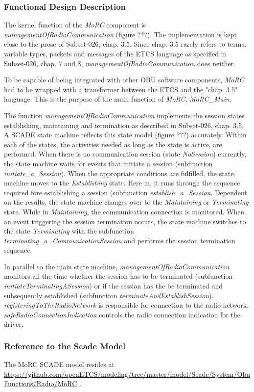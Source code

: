 \subsubsection{Functional Design Description}

The kernel function of the \textit{MoRC} component is \emph{managementOfRadioCommunication} (figure ???). The implementation is kept close to the prose of Subset-026, chap. 3.5. Since chap. 3.5 rarely refers to terms, variable types, packets and messages of the ETCS language as specified in Subset-026, chap. 7 and 8, \emph{managementOfRadioCommunication} does neither. 

To be capable of being integrated with other OBU software components, \emph{MoRC} had to be wrapped with a transformer between the ETCS and the "chap. 3.5" language. This is the purpose of the main function of \emph{MoRC}, \emph{MoRC\_Main}. 



The function \emph{managementOfRadioCommunication} implements the session states establishing, maintaining and termination as described in Subset-026, chap. 3.5. A SCADE state machine reflects this state model (figure ???) accurately. Within each of the states, the activities needed as long as the state is active, are performed. When there is no communication session (state \emph{NoSession}) currently, the state machine waits for events that initiate a session (subfunction \emph{initiate\_a\_Session}). When the appropriate conditions are fulfilled, the state machine moves to the \textit{Establishing} state. Here in, it runs through the sequence required fore establishing a session (subfunction \emph{establish\_a\_Session}. Dependent on the results, the state machine changes over to the \emph{Maintaining} or \emph{Terminating} state. While in \emph{Maintaining}, the communication connection is monitored. When an event triggering the session termination occurs, the state machine switches to the state \emph{Terminating} with the subfunction \emph{terminating\_a\_CommunicationSession} and performs the session termination sequence. 

In parallel to the main state machine, \emph{managementOfRadioCommunication} monitors all the time whether the session has to be terminated (subfunction \emph{initiateTerminatingASession}) or if the session has the be terminated and subsequently established (subfunction \emph{terminateAndEstablishSession}). \emph{registeringToTheRadioNetwork} is responsible for connection to the radio network. \emph{safeRadioConnectionIndication} controls the radio connection indication for the driver.


\subsubsection{Reference to the Scade Model}

The MoRC SCADE model resides at \url{https://github.com/openETCS/modeling/tree/master/model/Scade/System/ObuFunctions/Radio/MoRC} .






